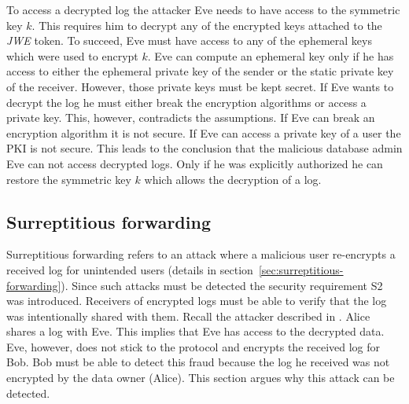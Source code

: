 \documentclass[../main.tex]{subfiles}
\begin{document}
To access a decrypted log the attacker Eve needs to have access to the symmetric key $k$.
This requires him to decrypt any of the encrypted keys attached to the \emph{JWE} token.
To succeed, Eve must have access to any of the ephemeral keys which were used to encrypt $k$.
Eve can compute an ephemeral key only if he has access to either the ephemeral private key of the sender or the static private key of the receiver.
However, those private keys must be kept secret.
If Eve wants to decrypt the log he must either break the encryption algorithms or access a private key.
This, however, contradicts the assumptions.
If Eve can break an encryption algorithm it is not secure.
If Eve can access a private key of a user the PKI is not secure.
This leads to the conclusion that the malicious database admin Eve can not access decrypted logs.
Only if he was explicitly authorized he can restore the symmetric key $k$ which allows the decryption of a log.


\subsection{Surreptitious forwarding}
Surreptitious forwarding refers to an attack where a malicious user re-encrypts a received log for unintended users (details in section~\ref{sec:surreptitious-forwarding}).
Since such attacks must be detected the security requirement S2 was introduced.
Receivers of encrypted logs must be able to verify that the log was intentionally shared with them.
Recall the attacker described in .
Alice shares a log with Eve.
This implies that Eve has access to the decrypted data.
Eve, however, does not stick to the protocol and encrypts the received log for Bob.
Bob must be able to detect this fraud because the log he received was not encrypted by the data owner (Alice).
This section argues why this attack can be detected.
\end{document}
